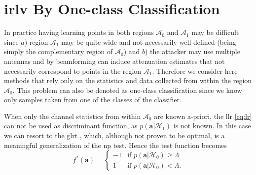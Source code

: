 \documentclass[draftcls,onecolumn,12pt]{IEEEtran}
\newcommand{\A}[1]{\mathcal{A}_#1}
\begin{document}

\section{\ac{irlv} By One-class Classification}
\label{sec:OneClass}
 

In practice having learning points in both regions $\mathcal A_0$ and ${\mathcal A}_1$ may be difficult since $a$) region $\A{1}$ may be quite wide and not necessarily well defined (being simply the complementary region of $\mathcal A_0$) and $b$) the attacker may use multiple antennas and by beamforming  can induce attenuation estimates that not necessarily correspond to points in the region $\A{1}$. Therefore we consider here methods that rely only on the statistics and data collected from within the region $\mathcal A_0$. This problem can also be denoted as one-class classification since we know only samples taken from one of the classes of the classifier. 


When only the channel statistics from within $\mathcal A_0$ are known a-priori,  the \ac{llr} \eqref{eq:lr} can not be used as discriminant function, as $p(\bm{a}|\mathcal{H}_1)$ is not known. In this case we can resort to the \ac{glrt} \cite{Kay-book}, which, although not proven to be optimal, is a meaningful generalization of the \ac{np} test. Hence the test function becomes 
\begin{equation}
f^*(\bm{a}) =
\begin{cases}
-1 &\text{if } p(\bm{a}|\mathcal{H}_0) \geq \Lambda \\
1 & \text{if } p(\bm{a}|\mathcal{H}_0) < \Lambda.
\end{cases}
\end{equation}
\end{document}
